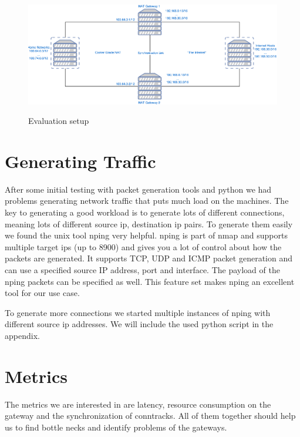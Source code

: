 \documentclass{report}
\begin{document}
\begin{figure}[ht]
	\centering
	\includegraphics[width=\textwidth]{../EvaluationSetup.pdf}
	\label{EvaluationSetup.pdf}
	\caption{Evaluation setup}  
\end{figure}

\section{Generating Traffic}\label{generating-traffic}

After some initial testing with packet generation tools and python we
had problems generating network traffic that puts much load on the
machines. The key to generating a good workload is to generate lots of
different connections, meaning lots of different source ip, destination
ip pairs. To generate them easily we found the unix tool nping\cite{nping}
very helpful. nping is part of nmap\cite{nmap} and supports multiple target
ips (up to 8900) and gives you a lot of control about how the packets
are generated. It supports TCP, UDP and ICMP packet generation and can
use a specified source IP address, port and interface. The payload of
the nping packets can be specified as well. This feature set makes nping
an excellent tool for our use case.

To generate more connections we started multiple instances of nping with
different source ip addresses. We will include the used python script in
the appendix.



\section{Metrics}\label{metrics}

The metrics we are interested in are latency, resource consumption on
the gateway and the synchronization of conntracks. All of them together
should help us to find bottle necks and identify problems of the
gateways.
\end{document}
